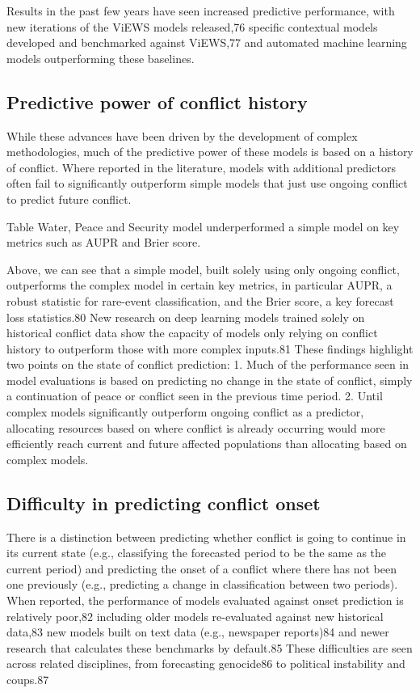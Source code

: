 \documentclass[runningheads]{llncs}
\begin{document}
    Results in the past few years have seen increased predictive performance, with new iterations of the ViEWS
    models released,76 specific contextual models developed and benchmarked against ViEWS,77 and automated
    machine learning models outperforming these baselines.

    \subsection{Predictive power of conflict history}
    While these advances have been driven by the development of complex methodologies, much of the
    predictive power of these models is based on a history of conflict. Where reported in the literature, models
    with additional predictors often fail to significantly outperform simple models that just use ongoing conflict
    to predict future conflict.

    Table Water, Peace and Security model underperformed a simple model
    on key metrics such as AUPR and Brier score.

    Above, we can see that a simple model, built solely using only ongoing conflict, outperforms the complex
    model in certain key metrics, in particular AUPR, a robust statistic for rare-event classification, and the Brier
    score, a key forecast loss statistics.80 New research on deep learning models trained solely on historical
    conflict data show the capacity of models only relying on conflict history to outperform those with more
    complex inputs.81
    These findings highlight two points on the state of conflict prediction:
    1. Much of the performance seen in model evaluations is based on predicting no change in the state of
    conflict, simply a continuation of peace or conflict seen in the previous time period.
    2. Until complex models significantly outperform ongoing conflict as a predictor, allocating resources based
    on where conflict is already occurring would more efficiently reach current and future affected
    populations than allocating based on complex models.

    \subsection{Difficulty in predicting conflict onset}
    There is a distinction between predicting whether conflict is going to continue in its current state (e.g.,
    classifying the forecasted period to be the same as the current period) and predicting the onset of a conflict
    where there has not been one previously (e.g., predicting a change in classification between two periods).
    When reported, the performance of models evaluated against onset prediction is relatively poor,82 including
    older models re-evaluated against new historical data,83 new models built on text data (e.g., newspaper
    reports)84 and newer research that calculates these benchmarks by default.85 These difficulties are seen
    across related disciplines, from forecasting genocide86 to political instability and coups.87
\end{document}
